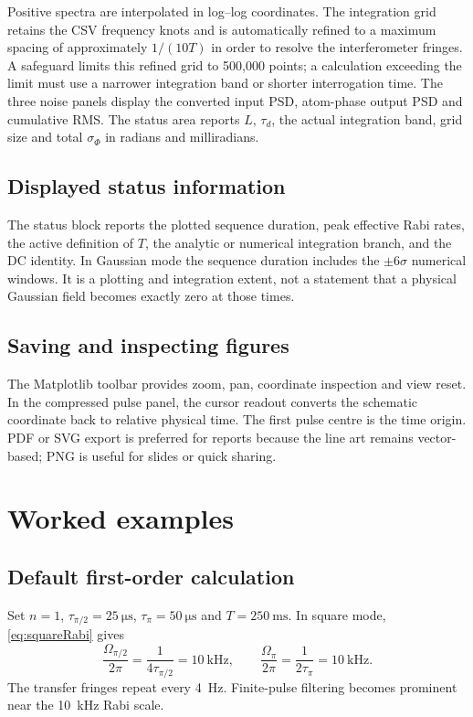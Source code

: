 \documentclass[11pt,a4paper]{article}
\newcommand{\tauhalf}{\tau_{\pi/2}}
\newcommand{\taupi}{\tau_{\pi}}
\newcommand{\Omegahalf}{\Omega_{\pi/2}}
\newcommand{\Omegapi}{\Omega_{\pi}}
\begin{document}
Positive spectra are interpolated in log--log coordinates. The integration grid retains the CSV frequency knots and is automatically refined to a maximum spacing of approximately $1/(10T)$ in order to resolve the interferometer fringes. A safeguard limits this refined grid to 500,000 points; a calculation exceeding the limit must use a narrower integration band or shorter interrogation time. The three noise panels display the converted input PSD, atom-phase output PSD and cumulative RMS. The status area reports $L$, $\tau_d$, the actual integration band, grid size and total $\sigma_\Phi$ in radians and milliradians.

\subsection{Displayed status information}

The status block reports the plotted sequence duration, peak effective Rabi rates, the active definition of $T$, the analytic or numerical integration branch, and the DC identity. In Gaussian mode the sequence duration includes the $\pm6\sigma$ numerical windows. It is a plotting and integration extent, not a statement that a physical Gaussian field becomes exactly zero at those times.

\subsection{Saving and inspecting figures}

The Matplotlib toolbar provides zoom, pan, coordinate inspection and view reset. In the compressed pulse panel, the cursor readout converts the schematic coordinate back to relative physical time. The first pulse centre is the time origin. PDF or SVG export is preferred for reports because the line art remains vector-based; PNG is useful for slides or quick sharing.

\section{Worked examples}

\subsection{Default first-order calculation}

Set $n=1$, $\tauhalf=\SI{25}{\micro\second}$, $\taupi=\SI{50}{\micro\second}$ and $T=\SI{250}{\milli\second}$. In square mode, \cref{eq:squareRabi} gives
\begin{equation}
\frac{\Omegahalf}{2\pi}=\frac{1}{4\tauhalf}=\SI{10}{\kilo\hertz},
\qquad
\frac{\Omegapi}{2\pi}=\frac{1}{2\taupi}=\SI{10}{\kilo\hertz}.
\end{equation}
The transfer fringes repeat every \SI{4}{\hertz}. Finite-pulse filtering becomes prominent near the \SI{10}{\kilo\hertz} Rabi scale.
\end{document}
